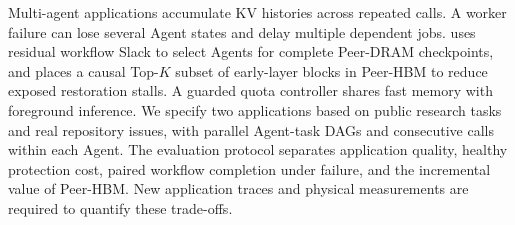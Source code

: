 Multi-agent applications accumulate KV histories across repeated calls.
A worker failure can lose several Agent states and delay multiple dependent
jobs. \system uses residual workflow Slack to select Agents for complete
Peer-DRAM checkpoints, and places a causal Top-$K$ subset of early-layer
blocks in Peer-HBM to reduce exposed restoration stalls. A guarded quota
controller shares fast memory with foreground inference. We specify two
applications based on public research tasks and real repository issues,
with parallel Agent-task DAGs and consecutive calls within each Agent.
The evaluation protocol separates application quality, healthy protection
cost, paired workflow completion under failure, and the incremental value
of Peer-HBM. New application traces and physical measurements are required
to quantify these trade-offs.
